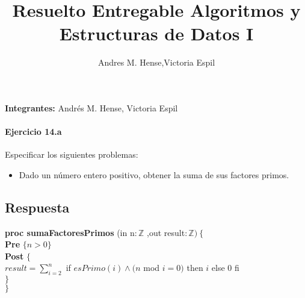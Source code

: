 \documentclass[a4paper]{article}
\title{Resuelto Entregable Algoritmos y Estructuras de Datos I}
\author{Andres M. Hense,Victoria Espil}
\date{}
\begin{document}




\begin{center}
\textbf{Integrantes:} Andrés M. Hense, Victoria Espil
\end{center}

\paragraph*{Ejercicio 14.a} Especificar los siguientes problemas:
	\begin{itemize}
		\item Dado un número entero positivo, obtener la suma de sus factores primos.
	\end{itemize}
	
\subsection*{Respuesta}

			\textbf{proc sumaFactoresPrimos }(in n$:\mathbb{Z}$
				,out result$: \mathbb{Z} )\ \{$\smallskip \\
			\hspace*{6mm} \textbf{Pre }$\{n>0 \}$\smallskip \\
			\hspace*{6mm} \textbf{Post }$\{$\\
			\hspace*{6mm} $result=\sum_{i=2}^{n}$ if $esPrimo(i)\wedge(n$ mod $i=0)$
			 then $i$ else 0 fi\\
			\hspace*{6mm} $\}$\\
			\hspace*{5mm}$\}$\smallskip \\
			
			
\end{document}
